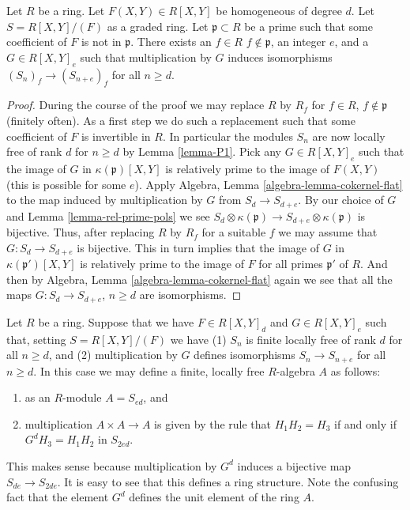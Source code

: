 \begin{lemma}
\label{lemma-P1-localize}
Let $R$ be a ring. Let $F(X, Y) \in R[X, Y]$ be homogeneous of degree
$d$. Let $S = R[X, Y]/(F)$ as a graded ring.
Let $\mathfrak p \subset R$ be a prime such that
some coefficient of $F$ is not in $\mathfrak p$.
There exists an $f \in R$ $f \not\in \mathfrak p$,
an integer $e$, and a $G \in R[X, Y]_e$
such that multiplication by $G$ induces isomorphisms
$(S_n)_f \to (S_{n + e})_f$ for all $n \geq d$.
\end{lemma}

\begin{proof}
During the course of the proof we may replace $R$ by $R_f$
for $f\in R$, $f\not\in \mathfrak p$ (finitely often).
As a first step we do such a replacement such that
some coefficient of $F$ is invertible in $R$.
In particular the modules $S_n$ are now locally
free of rank $d$ for $n \geq d$ by Lemma \ref{lemma-P1}.
Pick any $G \in R[X, Y]_e$ such that the image of
$G$ in $\kappa(\mathfrak p)[X, Y]$ is relatively
prime to the image of $F(X, Y)$ (this is possible for some $e$).
Apply Algebra, Lemma \ref{algebra-lemma-cokernel-flat} to the map
induced by multiplication by $G$ from $S_d \to S_{d + e}$.
By our choice of $G$ and Lemma \ref{lemma-rel-prime-pols}
we see
$S_d \otimes \kappa(\mathfrak p) \to S_{d + e} \otimes \kappa(\mathfrak p)$
is bijective. Thus, after replacing $R$ by $R_f$ for a suitable
$f$ we may assume that $G : S_d \to S_{d + e}$
is bijective. This in turn implies that the image
of $G$ in $\kappa(\mathfrak p')[X, Y]$ is relatively
prime to the image of $F$ for all primes $\mathfrak p'$
of $R$. And then by Algebra, Lemma \ref{algebra-lemma-cokernel-flat}
again we see that all the maps
$G : S_d \to S_{d + e}$, $n \geq d$ are isomorphisms.
\end{proof}

\begin{remark}
\label{remark-algebra}
Let $R$ be a ring. Suppose that we have $F \in R[X, Y]_d$
and $G \in R[X, Y]_e$ such that, setting $S = R[X, Y]/(F)$
we have (1) $S_n$ is finite locally free of rank $d$ for
all $n \geq d$, and (2) multiplication by $G$ defines
isomorphisms $S_n \to S_{n + e}$ for all $n \geq d$. In this
case we may define a finite, locally free $R$-algebra
$A$ as follows:
\begin{enumerate}
\item as an $R$-module $A = S_{ed}$, and
\item multiplication $A \times A \to A$ is given by
the rule that $H_1 H_2 = H_3$ if and only if $G^d H_3 = H_1 H_2$
in $S_{2ed}$.
\end{enumerate}
This makes sense because multiplication by $G^d$
induces a bijective map $S_{de} \to S_{2de}$.
It is easy to see that this defines a ring structure.
Note the confusing fact that the element $G^d$
defines the unit element of the ring $A$.
\end{remark}


